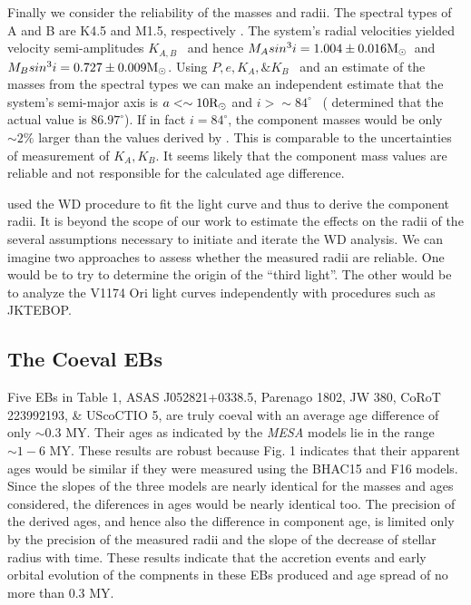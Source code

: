 \documentclass[12pt,preprint]{aastex6}
\begin{document}
Finally we consider the reliability of the masses and radii.
The spectral types of A and B are K4.5 and M1.5, respectively
\citep{2004ApJS..151..357S}.
The system's radial velocities yielded
velocity semi-amplitudes $K_{A,B}$ ~and hence
 $M_A sin^3 i = 1.004 \pm 0.016 \hbox{M$_\odot$}$~and
$M_B sin^3 i = 0.727 \pm 0.009\hbox{M$_\odot$}$. Using $P,e,K_A,
\&K_B$~ and an estimate of the masses from the 
spectral types we can make an independent 
estimate that the system's semi-major axis is 
$a <\sim 10 \hbox{R$_\odot$}$  and $i>\sim 84^\circ$
~( \citet{2004ApJS..151..357S} determined that
the actual value is $86.97^\circ$).  If  
in fact $i=84^\circ$, the component masses would 
be only $\sim 2\%$ larger than the values
derived by \citet{2004ApJS..151..357S}. This is 
comparable to the uncertainties
of measurement of $K_A,K_B$.  It seems likely that
the component mass values are reliable and  not 
responsible for the calculated age difference. 

\citet{2004ApJS..151..357S} used the WD procedure to 
fit the light curve and thus to derive the component 
radii. It is beyond the scope of our work to estimate
the effects on the radii of the several assumptions
necessary to initiate and iterate the WD analysis.
We can imagine two approaches to assess whether the 
measured radii are reliable. One would be to try
to determine the origin of the ``third light''.
The other would be to analyze the V1174 Ori light 
curves independently with  procedures such as JKTEBOP.

\subsection{The Coeval EBs}

Five EBs in Table 1, ASAS J052821+0338.5, Parenago 1802,
JW 380, CoRoT 223992193, \& UScoCTIO 5, are truly coeval 
with an average age difference of only 
$\sim 0.3$ MY. Their  ages as indicated
by the {\it MESA} models lie in the range $\sim
1 - 6$ MY. These results are robust because
  Fig. 1 indicates that their apparent 
ages would be similar if they 
were measured using the BHAC15 and F16 models.
Since the slopes of  the three models are nearly 
identical for the masses and ages considered,
the diferences in ages would be nearly identical too.    
The precision of the derived
ages, and hence also the difference in component
age, is limited only by the precision of the 
measured radii and the slope of the decrease of 
stellar radius with time.
These results indicate that the accretion events 
and early orbital evolution of the compnents in 
these EBs produced and age spread of no more 
than 0.3 MY.
\end{document}
